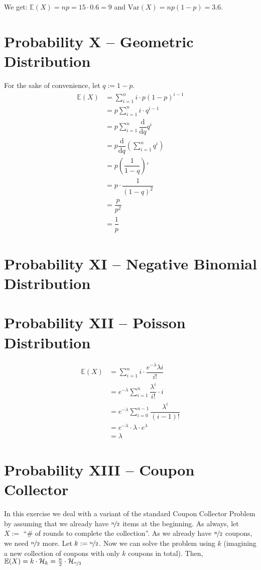 \documentclass{article}
\begin{document}
We get: $\mathbb E(X) = np = 15 \cdot 0.6 = 9$ and $\mathrm{Var}(X) = np(1-p) = 3.6$.

\section{Probability X -- Geometric Distribution}
For the sake of convenience, let $q := 1-p$.
\begin{align*}
    \mathbb E(X) &= \sum_{i=1}^n i \cdot p(1-p)^{i-1} \\
    &= p \sum_{i=1}^n i \cdot q^{i-1} \\
    &= p \sum_{i=1}^n \dfrac{\mathrm d}{\mathrm dq} q^i \\
    &= p \dfrac{\mathrm d}{\mathrm dq} \left(\sum_{i=1}^n q^i\right) \\
    &= p \left(\dfrac{1}{1-q}\right)' \\
    &= p \cdot \dfrac{1}{(1-q)^2} \\
    &=  \dfrac{p}{p^2} \\
    &= \dfrac{1}{p}
\end{align*}

\section{Probability XI -- Negative Binomial Distribution}
\section{Probability XII -- Poisson Distribution} 
\begin{align*}
    \mathbb E(X) &= \sum_{i=1}^n i \cdot \dfrac{e^{-\lambda} \lambda i}{i!} \\
    &= e^{-\lambda} \sum_{i=1}^n \dfrac{\lambda ^i}{i!} \cdot i \\
    &= e^{-\lambda} \sum_{i=0}^{n-1} \dfrac{\lambda^i}{(i-1)!} \\
    &= e^{-\lambda} \cdot \lambda \cdot e^{\lambda} \\
    &= \lambda
\end{align*}
\section{Probability XIII -- Coupon Collector}
In this exercise we deal with a variant of the standard Coupon Collector Problem by assuming that we already have $\nicefrac{n}{2}$ items at the beginning. As always, let $X:=$ ``\# of rounds to complete the collection''.
As we already have $\nicefrac{n}{2}$ coupons, we need $\nicefrac{n}{2}$ more. Let $k := \nicefrac{n}{2}$. Now we can solve the problem using $k$ (imagining a new collection of coupons with only $k$ coupons in total). Then, $\mathbb E(X) = k \cdot \mathcal H_k = \frac{n}{2} \cdot \mathcal H_{\nicefrac{n}{2}}$
\end{document}
